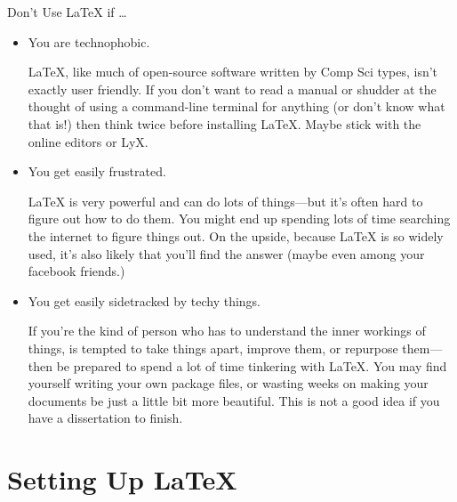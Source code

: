 \begin{frame}[fragile]{Don't Use \LaTeX{} if \dots}

\begin{itemize}
\item You are technophobic.

\begin{articleonly}
\LaTeX{}, like much of open-source software written by Comp Sci types,
isn't exactly user friendly. If you don't want to read a manual or
shudder at the thought of using a command-line terminal for anything
(or don't know what that is!) then think twice before installing
\LaTeX. Maybe stick with the online editors or LyX.
\end{articleonly}

\item You get easily frustrated.

\begin{articleonly}
\LaTeX{} is very powerful and can do lots of things---but it's often
hard to figure out how to do them.  You might end up spending lots of
time searching the internet to figure things out. On the upside,
because \LaTeX{} is so widely used, it's also likely that you'll find
the answer (maybe even among your facebook friends.)
\end{articleonly}

\item You get easily sidetracked by techy things.

\begin{articleonly}
If you're the kind of person who has to understand the inner workings
of things, is tempted to take things apart, improve them, or repurpose
them---then be prepared to spend a lot of time tinkering with
\LaTeX. You may find yourself writing your own package files, or
wasting weeks on making your documents be just a little bit more
beautiful. This is not a good idea if you have a dissertation to
finish.
\end{articleonly}
\end{itemize}

\end{frame}

\section{Setting Up \LaTeX}

